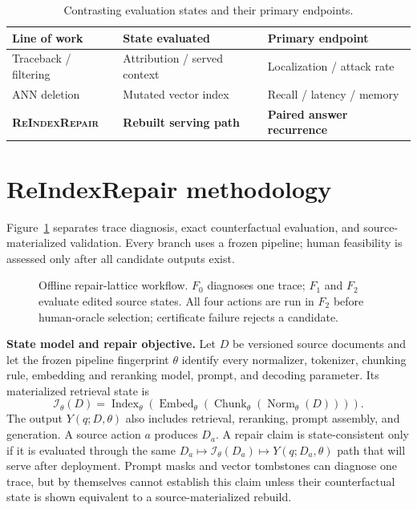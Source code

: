 \documentclass{article}
\newcommand{\method}{\textsc{ReIndexRepair}}
\newcommand{\fzero}{\ensuremath{F_0}}
\newcommand{\fone}{\ensuremath{F_1}}
\newcommand{\ftwo}{\ensuremath{F_2}}
\begin{document}
\begin{table}[t]
\caption{Contrasting evaluation states and their primary endpoints.}
\label{tab:closest}
\centering
\fontsize{9}{10.5}\selectfont
\renewcommand{\arraystretch}{1.15}
\setlength{\tabcolsep}{3pt}
\begin{tabularx}{\columnwidth}{@{}>{\raggedright\arraybackslash}X>{\raggedright\arraybackslash}X>{\raggedright\arraybackslash}X@{}}
\toprule
Line of work & State evaluated & Primary endpoint\\
\midrule
Traceback / filtering & Attribution / served context & Localization / attack rate\\
ANN deletion & Mutated vector index & Recall / latency / memory\\
\textbf{\method{}} & \textbf{Rebuilt serving path} & \textbf{Paired answer recurrence}\\
\bottomrule
\end{tabularx}
\end{table}

\section{ReIndexRepair methodology}
Figure~\ref{fig:overview} separates trace diagnosis, exact counterfactual
evaluation, and source-materialized validation. Every branch uses a frozen
pipeline; human feasibility is assessed only after all candidate outputs exist.
\begin{figure}[t]
\centering

\caption{Offline repair-lattice workflow. \fzero{} diagnoses one trace; \fone{} and \ftwo{}
evaluate edited source states. All four actions are run in \ftwo{} before
human-oracle selection; certificate failure rejects a candidate.}
\label{fig:overview}
\end{figure}
\textbf{State model and repair objective.} Let $D$ be versioned source
documents and let the frozen pipeline fingerprint $\theta$ identify every
normalizer, tokenizer, chunking rule, embedding and reranking model, prompt,
and decoding parameter. Its materialized retrieval state is
\begin{equation}
 \mathcal I_\theta(D)=\operatorname{Index}_\theta(
 \operatorname{Embed}_\theta(\operatorname{Chunk}_\theta(
 \operatorname{Norm}_\theta(D)))).
\end{equation}
The output $Y(q;D,\theta)$ also includes retrieval, reranking,
prompt assembly, and generation. A source action $a$ produces $D_a$. A repair
claim is state-consistent only if it is evaluated through the same
$D_a\mapsto\mathcal I_\theta(D_a)\mapsto Y(q;D_a,\theta)$ path that will serve
after deployment. Prompt masks and vector tombstones can diagnose one trace,
but by themselves cannot establish this claim unless their counterfactual state
is shown equivalent to a source-materialized rebuild.
\end{document}
